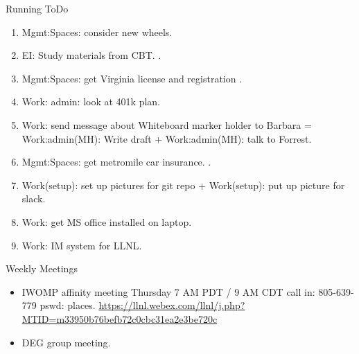 \begin{columns}
\begin{column}{0.5\linewidth}
\begin{block}{Running ToDo}
\begin{enumerate}
        \item \tiny  Mgmt:Spaces: consider new wheels.
        \item \tiny EI: Study materials from CBT.  
          .

        \item \tiny Mgmt:Spaces: get Virginia license and registration . 



        \item \tiny Work: admin: look at 401k plan. 
        \item \tiny Work: send message about Whiteboard marker holder to
          Barbara = Work:admin(MH): Write draft +
          Work:admin(MH): talk to Forrest. 
        \item \tiny Mgmt:Spaces: get metromile car insurance.   . 
        \item \tiny Work(setup): set up pictures for git repo +
          Work(setup): put up picture for slack. 

        \item \tiny Work: get MS office installed on laptop. 
        \item \tiny Work: IM system for LLNL. 

        \end{enumerate}
      \end{block}
 

      \begin{block}{Weekly Meetings}
        \begin{itemize}
          \tiny \item \tiny IWOMP affinity meeting Thursday 7 AM PDT / 9 AM
          CDT call in: 805-639-779 pswd: places. \url{https://llnl.webex.com/llnl/j.php?MTID=m33950b76befb72c0cbc31ea2e3be720c}
        \item \tiny DEG group meeting.  
        \end{itemize}
      \end{block} 
     

\end{column}
\end{columns}
